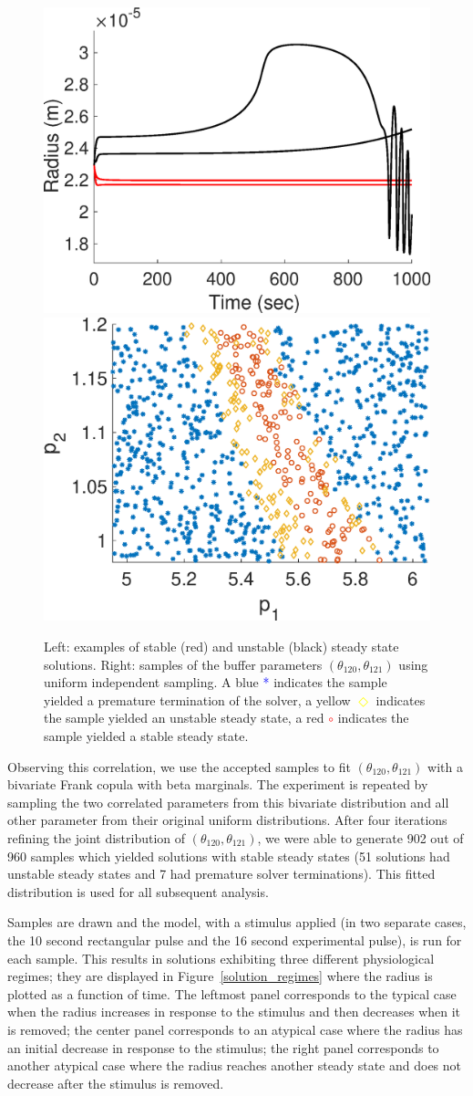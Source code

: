\documentclass[smallextended]{svjour3}
\numberwithin{equation}{section}
\begin{document}
\begin{figure}[h]
\centering
\includegraphics[width=.4 \textwidth]{Figures/Steady_State_Curves.eps}
\includegraphics[width=.4 \textwidth]{Figures/First_Iteration_Samples.eps}
\caption{Left: examples of stable (red) and unstable (black) steady state solutions. Right: samples of the buffer parameters $(\theta_{120},\theta_{121})$ using uniform independent sampling. A blue \textcolor{blue}{*} indicates the sample yielded a premature termination of the solver, a yellow \textcolor{yellow}{$\Diamond$} indicates the sample yielded an unstable steady state, a red \textcolor{red}{$\circ$} indicates the sample yielded a stable steady state.}
\label{steady_states}
\end{figure}

Observing this correlation, we use the accepted samples to fit $(\theta_{120},\theta_{121})$ with a bivariate Frank copula with beta marginals. The experiment is repeated by sampling the two correlated parameters from this bivariate distribution and all other parameter from their original uniform distributions. After four iterations refining the joint distribution of $(\theta_{120},\theta_{121})$, we were able to generate 902 out of 960 samples which yielded solutions with stable steady states (51 solutions had unstable steady states and 7 had premature solver terminations). This fitted distribution is used for all subsequent analysis. 

Samples are drawn and the model, with a stimulus applied (in two separate cases, the 10 second rectangular pulse and the 16 second experimental pulse), is run for each sample. This results in solutions exhibiting three different physiological regimes; they are displayed in Figure~\ref{solution_regimes} where the radius is plotted as a function of time. The leftmost panel corresponds to the typical case when the radius increases in response to the stimulus and then decreases when it is removed; the center panel corresponds to an atypical case where the radius has an initial decrease in response to the stimulus; the right panel corresponds to another atypical case where the radius reaches another steady state and does not decrease after the stimulus is removed.
\end{document}
